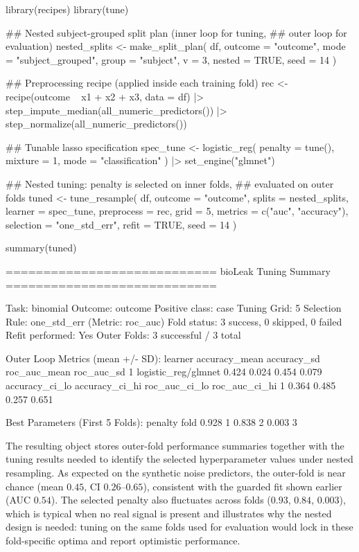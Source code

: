 \documentclass[article,shortnames]{jss}
\begin{document}
\begin{CodeInput}
library(recipes)
library(tune)

## Nested subject-grouped split plan (inner loop for tuning,
## outer loop for evaluation)
nested_splits <- make_split_plan(
  df,
  outcome = "outcome",
  mode = "subject_grouped",
  group = "subject",
  v = 3,
  nested = TRUE,
  seed = 14
)

## Preprocessing recipe (applied inside each training fold)
rec <- recipe(outcome ~ x1 + x2 + x3, data = df) |>
  step_impute_median(all_numeric_predictors()) |>
  step_normalize(all_numeric_predictors())

## Tunable lasso specification
spec_tune <- logistic_reg(
  penalty = tune(),
  mixture = 1,
  mode = "classification"
) |>
  set_engine("glmnet")

## Nested tuning: penalty is selected on inner folds,
## evaluated on outer folds
tuned <- tune_resample(
  df,
  outcome = "outcome",
  splits = nested_splits,
  learner = spec_tune,
  preprocess = rec,
  grid = 5,
  metrics = c("auc", "accuracy"),
  selection = "one_std_err",
  refit = TRUE,
  seed = 14
)

summary(tuned)
\end{CodeInput}
\begin{CodeOutput}
============================
 bioLeak Tuning Summary
============================

Task: binomial
Outcome: outcome
Positive class: case
Tuning Grid: 5
Selection Rule: one_std_err (Metric: roc_auc)
Fold status: 3 success, 0 skipped, 0 failed
Refit performed: Yes
Outer Folds: 3 successful / 3 total

Outer Loop Metrics (mean +/- SD):
              learner accuracy_mean accuracy_sd roc_auc_mean roc_auc_sd
1 logistic_reg/glmnet         0.424       0.024        0.454      0.079
  accuracy_ci_lo accuracy_ci_hi roc_auc_ci_lo roc_auc_ci_hi
1          0.364          0.485         0.257         0.651

Best Parameters (First 5 Folds):
 penalty fold
   0.928    1
   0.838    2
   0.003    3
\end{CodeOutput}

\noindent
The resulting object stores outer-fold performance summaries together with the tuning results needed to identify the selected hyperparameter values under nested resampling. As expected on the synthetic noise predictors, the outer-fold  is near chance (mean $0.45$, CI $0.26$--$0.65$), consistent with the guarded fit shown earlier (AUC $0.54$). The selected penalty also fluctuates across folds ($0.93$, $0.84$, $0.003$), which is typical when no real signal is present and illustrates why the nested design is needed: tuning on the same folds used for evaluation would lock in these fold-specific optima and report optimistic performance.
\end{document}
